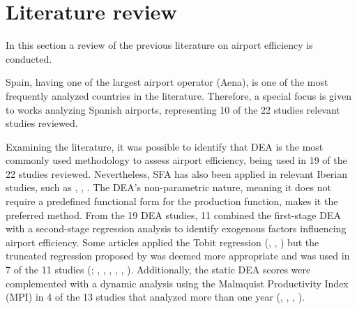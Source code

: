 
\section{Literature review}
\label{sec:backg}
In this section a review of the previous literature on airport efficiency is conducted.

Spain, having one of the largest airport operator (Aena), is one of the most frequently analyzed countries in the literature. Therefore, a special focus is given to works analyzing Spanish airports, representing 10 of the 22 studies relevant studies reviewed.

Examining the literature, it was possible to identify that DEA is the most commonly used methodology to assess airport efficiency, being used in 19 of the 22 studies reviewed. Nevertheless, SFA has also been applied in relevant Iberian studies, such as \cite{barros2008}, \cite{tovar2010}, \cite{martin2011}. The DEA's non-parametric nature, meaning it does not require a predefined functional form for the production function, makes it the preferred method. From the 19 DEA studies, 11 combined the first-stage DEA with a second-stage regression analysis to identify exogenous factors influencing airport efficiency. Some articles applied the Tobit regression (\cite{coto-millan2014}, \cite{fragoudaki2016}, \cite{coto-millan2016}) but the truncated regression proposed by \cite{simar2007} was deemed more appropriate and was used in 7 of the 11 studies (\cite{barrosdieke2008}; \cite{barros2008b}, \cite{tsekeris2011}, \cite{chang2013}, \cite{adler2013}, \cite{fernandez2022}, \cite{cifuentes-faura2023}).
Additionally, the static DEA scores were complemented with a dynamic analysis using the Malmquist Productivity Index (MPI) in 4 of the 13 studies that analyzed more than one year (\cite{fung2008}, \cite{tovar2010}, \cite{coto-millan2014}, \cite{inglada2018}).


